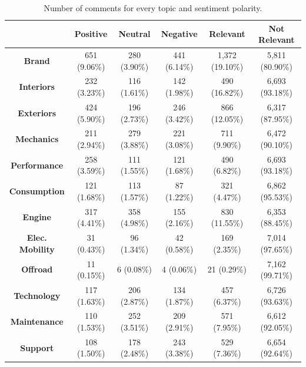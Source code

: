 \begin{table}[H]
	\renewcommand{\arraystretch}{1.3}
	\centering
	\footnotesize
	\begin{tabular}{| c | c | c | c | c | c |} 
		\hline
		& \textbf{Positive} & \textbf{Neutral} & \textbf{Negative} & \textbf{Relevant} & \textbf{Not Relevant} \\ %
		\hline
		\hline
		\textbf{Brand}& 651 (9.06\%) & 280 (3.90\%) & 441 (6.14\%) & 1,372 (19.10\%) & 5,811 (80.90\%) \\ %
		\hline
		\textbf{Interiors}& 232 (3.23\%) & 116 (1.61\%) & 142 (1.98\%) & 490 (16.82\%) & 6,693  (93.18\%) \\ %
		\hline
		\textbf{Exteriors}& 424 (5.90\%) & 196 (2.73\%) & 246 (3.42\%) & 866 (12.05\%) & 6,317 (87.95\%) \\ %
		\hline
		\textbf{Mechanics}& 211 (2.94\%) & 279 (3.88\%) & 221 (3.08\%) & 711 (9.90\%) & 6,472 (90.10\%) \\ %
		\hline
		\textbf{Performance}& 258 (3.59\%) & 111 (1.55\%) & 121 (1.68\%) & 490 (6.82\%) & 6,693 (93.18\%) \\ %
		\hline
		\textbf{Consumption}& 121 (1.68\%) & 113 (1.57\%) & 87 (1.22\%) & 321 (4.47\%) & 6,862 (95.53\%) \\ %
		\hline
		\textbf{Engine}& 317 (4.41\%) & 358 (4.98\%) & 155 (2.16\%) & 830 (11.55\%) & 6,353 (88.45\%) \\ %
		\hline
		\textbf{Elec. Mobility}& 31 (0.43\%) & 96 (1.34\%) & 42 (0.58\%) & 169 (2.35\%) & 7,014 (97.65\%) \\ %
		\hline
		\textbf{Offroad}& 11 (0.15\%) & 6 (0.08\%) & 4 (0.06\%) & 21 (0.29\%) & 7,162 (99.71\%) \\ %
		\hline
		\textbf{Technology}& 117 (1.63\%) & 206 (2.87\%) & 134 (1.87\%) & 457 (6.37\%) & 6,726 (93.63\%) \\ %
		\hline
		\textbf{Maintenance}& 110 (1.53\%) & 252 (3.51\%) & 209 (2.91\%) & 571 (7.95\%) & 6,612 (92.05\%) \\ %
		\hline
		\textbf{Support}& 108 (1.50\%) & 178 (2.48\%) & 243 (3.38\%) & 529 (7.36\%) & 6,654 (92.64\%) \\ %
		\hline
		
	\end{tabular}
	\caption{Number of comments for every topic and sentiment polarity.}
	\label{table:annotations-distribution}
\end{table}

